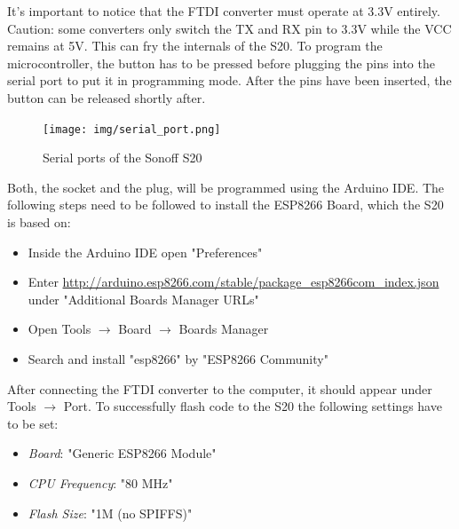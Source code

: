 It's important to notice that the FTDI converter must operate at 3.3V entirely. Caution: some converters only switch the TX and RX pin to 3.3V while the VCC remains at 5V. This can fry the internals of the S20. To program the microcontroller, the button has to be pressed before plugging the pins into the serial port to put it in programming mode. After the pins have been inserted, the button can be released shortly after.
\\
\begin{figure}[h]
    \texttt{[image: img/serial\_port.png]}
    \caption{Serial ports of the Sonoff S20}
    \label{fig:S20_serial}
\end{figure}
\newpage
Both, the socket and the plug, will be programmed using the Arduino IDE. The following steps need to be followed to install the ESP8266 Board, which the S20 is based on:

\begin{itemize}
    \item Inside the Arduino IDE open "Preferences"
    \item Enter \url{http://arduino.esp8266.com/stable/package_esp8266com_index.json} under "Additional Boards Manager URLs"
    \item Open Tools $\rightarrow$ Board $\rightarrow$ Boards Manager
    \item Search and install "esp8266" by "ESP8266 Community"
\end{itemize}

After connecting the FTDI converter to the computer, it should appear under Tools $\rightarrow$ Port. To successfully flash code to the S20 the following settings have to be set:

\begin{itemize}
    \item \textit{Board}: "Generic ESP8266 Module"
    \item \textit{CPU Frequency}: "80 MHz"
    \item \textit{Flash Size}: "1M (no SPIFFS)"
\end{itemize}
\leavevmode

